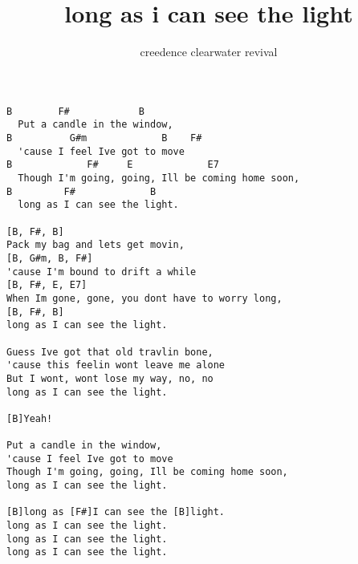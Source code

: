 \author{creedence clearwater revival}
\title{long as i can see the light}
\maketitle
\begin{verbatim}
B        F#            B        
  Put a candle in the window, 
B          G#m             B    F# 
  'cause I feel Ive got to move
B             F#     E             E7
  Though I'm going, going, Ill be coming home soon,
B         F#             B
  long as I can see the light.

[B, F#, B]
Pack my bag and lets get movin, 
[B, G#m, B, F#]
'cause I'm bound to drift a while
[B, F#, E, E7]
When Im gone, gone, you dont have to worry long,
[B, F#, B]
long as I can see the light.

Guess Ive got that old travlin bone, 
'cause this feelin wont leave me alone
But I wont, wont lose my way, no, no
long as I can see the light.

[B]Yeah!

Put a candle in the window, 
'cause I feel Ive got to move
Though I'm going, going, Ill be coming home soon,
long as I can see the light.

[B]long as [F#]I can see the [B]light.
long as I can see the light.
long as I can see the light.
long as I can see the light.
\end{verbatim}